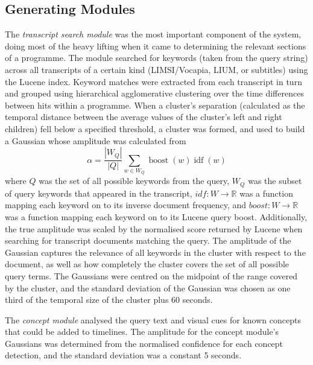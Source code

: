 \documentclass{../acm_proc_article-me11_tweaked}
\begin{document}
\subsection{Generating Modules}
The \emph{transcript search module} was the most important component of the system, doing 
most of the heavy lifting when it came to determining the relevant sections 
of a programme. The module searched for keywords (taken from the query string) 
across all transcripts of a certain kind (LIMSI/Vocapia, LIUM, or subtitles) using the Lucene index. Keyword matches were extracted from each transcript in turn and grouped using hierarchical agglomerative clustering over the time differences between hits within a programme. When a cluster's separation (calculated as the temporal distance between the average values of the cluster's left and right children) fell below a specified threshold, a cluster was formed, and used to build a Gaussian whose amplitude was calculated from \[\alpha = \frac{| W_Q |}{| Q |} \sum_{w \in W_Q} \operatorname{boost}(w) \operatorname{idf}(w)\] where \(Q\) was the set of all possible keywords from the query,
\(W_Q\) was the subset of query keywords that appeared in the transcript, 
 \(idf : W \to \mathbb{R}\) was a 
function mapping each keyword on to its inverse document frequency, and 
\(boost : W \to \mathbb{R}\) was a function mapping each keyword on to its 
Lucene query boost. Additionally, the true amplitude was scaled by the 
normalised score returned by Lucene when searching for transcript 
documents matching the query. The amplitude of the Gaussian captures the 
relevance of all keywords in the cluster with respect to the document, as well 
as how completely the cluster covers the set of all possible query terms. The 
Gaussians were centred on the midpoint of the range covered by the cluster, 
and the standard deviation of the Gaussian was chosen as one third of the 
temporal size of the cluster plus 60 seconds.

The \emph{concept module} analysed the query text and visual cues for known concepts that could be added to timelines. The amplitude for the concept 
module's Gaussians was determined from the normalised confidence for each 
concept detection, and the standard deviation was a constant 5 seconds. 
\end{document}
